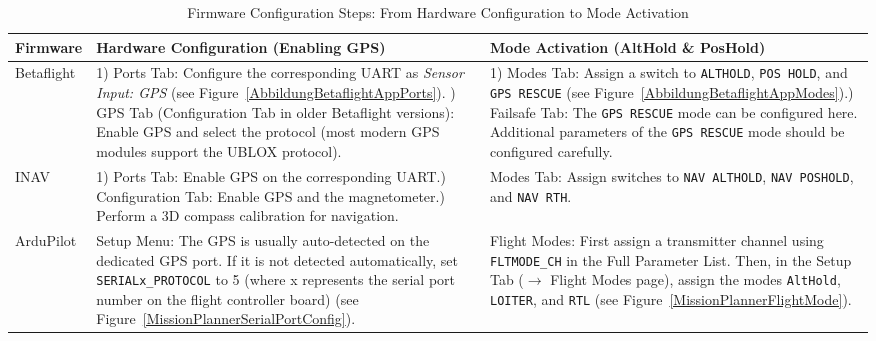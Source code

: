 \begin{paracol}{2}[]
\begin{table}[htb!]
\centering
\caption{Firmware Configuration Steps: From Hardware Configuration to Mode Activation}
\label{TableFirmwareConfigForGPS}
\setlength{\tabcolsep}{4pt}
\renewcommand{\arraystretch}{1.4}
\scriptsize
\begin{tabularx}{\textwidth}{lXX}
\toprule
Firmware & Hardware Configuration (Enabling GPS) & Mode Activation (AltHold \& PosHold) \\
\midrule
Betaflight 
&
1) Ports Tab: Configure the corresponding UART as \textit{Sensor Input: GPS} (see Figure~\ref{AbbildungBetaflightAppPorts}). \newline
2) GPS Tab (Configuration Tab in older Betaflight versions): Enable GPS and select the protocol (most modern GPS modules support the UBLOX protocol).
&
1) Modes Tab: Assign a switch to \texttt{ALTHOLD}, \texttt{POS HOLD}, and \texttt{GPS RESCUE} (see Figure~\ref{AbbildungBetaflightAppModes}).\newline
2) Failsafe Tab: The \texttt{GPS RESCUE} mode can be configured here. Additional parameters of the \texttt{GPS RESCUE} mode should be configured carefully.
\\
\midrule
INAV 
&
1) Ports Tab: Enable GPS on the corresponding UART.\newline
2) Configuration Tab: Enable GPS and the magnetometer.\newline
3) Perform a 3D compass calibration for navigation.
&
Modes Tab: Assign switches to \texttt{NAV ALTHOLD}, \texttt{NAV POSHOLD}, and \texttt{NAV RTH}.  
\\
\midrule
ArduPilot 
&
Setup Menu: The GPS is usually auto-detected on the dedicated GPS port. If it is not detected automatically, set \texttt{SERIALx\_PROTOCOL} to 5 (where x represents the serial port number on the flight controller board) (see Figure~\ref{MissionPlannerSerialPortConfig}). 
&
Flight Modes: First assign a transmitter channel using \texttt{FLTMODE\_CH} in the Full Parameter List. Then, in the Setup Tab (\(\longrightarrow\) Flight Modes page), assign the modes \texttt{AltHold}, \texttt{LOITER}, and \texttt{RTL} (see Figure~\ref{MissionPlannerFlightMode}).
\\
\bottomrule
\end{tabularx}
\end{table}


\renewcommand{\deutschertitel}{Positionsbestimmung ohne GPS (Optischer Fluss und Entfernungsmesser)}
\renewcommand{\englischertitel}{GPS-Denied Position Estimation (Optical Flow and Rangefinder Sensors)}
\makroabschnitt
\label{GpsDeniedPositionEstimation}


\end{paracol}
